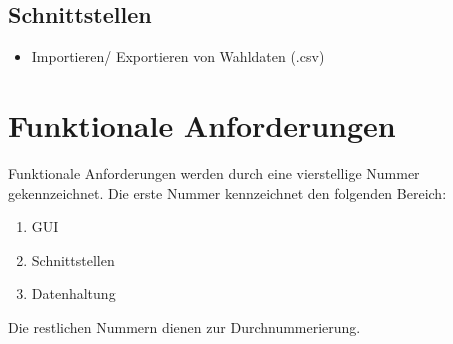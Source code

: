 \documentclass[10pt,a4paper]{article}
\begin{document}
\subsection{Schnittstellen}
\begin{itemize}
\item Importieren/ Exportieren von Wahldaten (.csv)
\end{itemize}


\section{Funktionale Anforderungen}
Funktionale Anforderungen werden durch eine vierstellige Nummer gekennzeichnet. Die erste Nummer kennzeichnet den folgenden Bereich:
\begin{enumerate}
	\item GUI
	\item Schnittstellen
	\item Datenhaltung
\end{enumerate}
Die restlichen Nummern dienen zur Durchnummerierung.

\newpage
\end{document}
